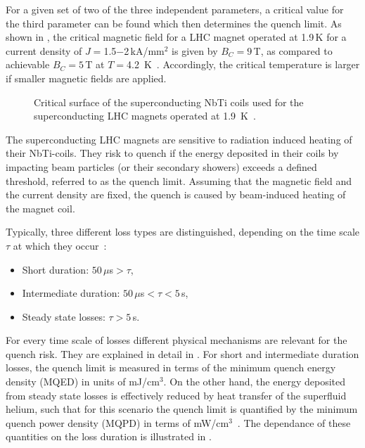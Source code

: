 For a given set of two of the three independent parameters, a critical value for the third parameter can be found which then determines the quench limit. As shown in , the critical magnetic field for a LHC magnet operated at 1.9\,K for a current density of $J=$1.5$-$2\,kA/mm$^2$ is given by $B_C = 9\,$T, as compared to achievable $B_C=5\,$T at $T=$4.2~K~\cite{bruening:nature07}. Accordingly, the critical temperature is larger if smaller magnetic fields are applied.

\begin{figure}[b]
  \centering
  \caption{Critical surface of the superconducting NbTi coils used for the superconducting LHC magnets operated at 1.9~K~\cite{courier2013_quench}.}  
  \label{pic:16070401}
  \end{figure}

The superconducting LHC magnets are sensitive to radiation induced heating of their NbTi-coils. They risk to quench if the energy deposited in their coils by impacting beam particles (or their secondary showers) exceeds a defined threshold, referred to as the quench limit. Assuming that the magnetic field and the current density are fixed, the quench is caused by beam-induced heating of the magnet coil. 

Typically, three different loss types are distinguished, depending on the time scale $\tau$ at which they occur~\cite{PhysRevSTAB.18.061002}:
\begin{itemize}
  \item Short duration: $50\,\mu$s$>\tau$,
  \item Intermediate duration: $50\,\mu$s$<\tau< 5\,$s,
  \item Steady state losses: $\tau>5\,$s.
\end{itemize}
For every time scale of losses different physical mechanisms are relevant for the quench risk. They are explained in detail in \cite{PhysRevSTAB.18.061002}. For short and intermediate duration losses, the quench limit is measured in terms of the minimum quench energy density (MQED) in units of mJ/cm$^3$. On the other hand, the energy deposited from steady state losses is effectively reduced by heat transfer of the superfluid helium, such that for this scenario the quench limit is quantified by the minimum quench power density (MQPD) in terms of mW/cm$^3$~\cite{lhcprojreport44,PhysRevSTAB.18.061002}. The dependance of these quantities on the loss duration is illustrated in .

